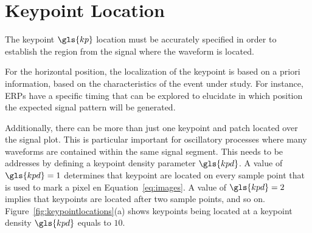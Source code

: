


\section{Keypoint Location}
\label{keypointlocation}

%


The keypoint $\gls{kp}$ location must be accurately specified in order to establish the region from the signal where the waveform is located.

For the horizontal position, the localization of the keypoint is based on a priori information, based on the characteristics of the event under study.  For instance, ERPs have a specific timing that can be explored to elucidate in which position the expected signal pattern will be generated.

Additionally, there can be more than just one keypoint and patch located over the signal plot.  This is particular important for oscillatory processes where many waveforms are contained within the same signal segment.  This needs to be addresses by defining a keypoint density parameter $\gls{kpd}$.  A value of $\gls{kpd}=1$ determines that keypoint are located on every sample point that is used to mark a pixel en Equation~\ref{eq:images}.  A value of $\gls{kpd}=2$ implies that keypoints are located after two sample points, and so on.  Figure~\ref{fig:keypointlocations}(a) shows keypoints being located at a keypoint density $\gls{kpd}$ equals to $10$.

